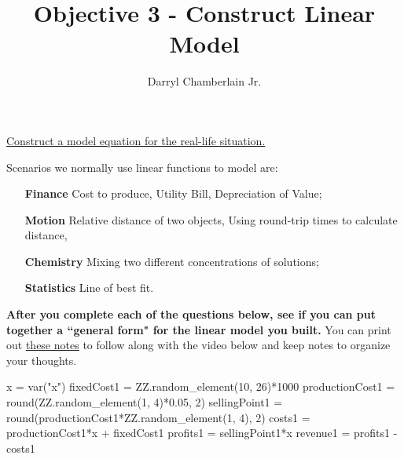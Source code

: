 \documentclass{ximera}
\author{Darryl Chamberlain Jr.}
\title{Objective 3 - Construct Linear Model}
\begin{document}
\begin{abstract}

\end{abstract}

\maketitle
 
\href{https://cnx.org/contents/mwjClAV_@15.1:xJt0U6vR@13/2-3-Models-and-Applications}{Construct a model equation for the real-life situation.}
 

Scenarios we normally use linear functions to model are:
	\begin{itemize}
		\item[\textbf{Finance}] Cost to produce, Utility Bill, Depreciation of Value; 
		\item[\textbf{Motion}] Relative distance of two objects, Using round-trip times to calculate distance, 
		\item[\textbf{Chemistry}] Mixing two different concentrations of solutions;
		\item[\textbf{Statistics}] Line of best fit.
	\end{itemize}

\textbf{After you complete each of the questions below, see if you can put together a ``general form" for the linear model you built.} You can print out \href{http://people.clas.ufl.edu/dchamberlain31/files/M9M-Objective-3-Construct-Linear-Model.pdf}{these notes} to follow along with the video below and keep notes to organize your thoughts.


\begin{sagesilent}
x = var("x")
fixedCost1 = ZZ.random_element(10, 26)*1000
productionCost1 = round(ZZ.random_element(1, 4)*0.05, 2)
sellingPoint1 = round(productionCost1*ZZ.random_element(1, 4), 2)
costs1 = productionCost1*x + fixedCost1
profits1 = sellingPoint1*x
revenue1 = profits1 - costs1
\end{sagesilent}
\end{document}
